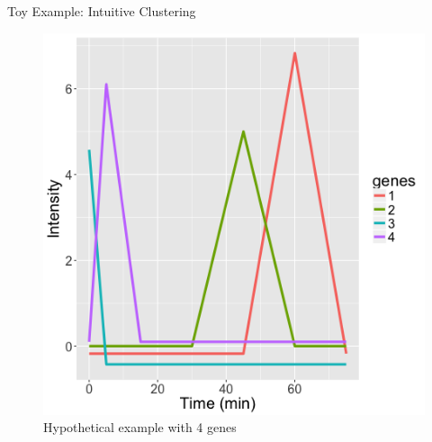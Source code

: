 \documentclass[10pt]{beamer}
\begin{document}
\begin{frame}{Toy Example: Intuitive Clustering}
    \begin{figure}
     \includegraphics[width=0.5\linewidth]{Toy.png}
      \caption{Hypothetical example with 4 genes}
       \label{fig:sub11}
    \end{figure}
\end{frame}
\end{document}

